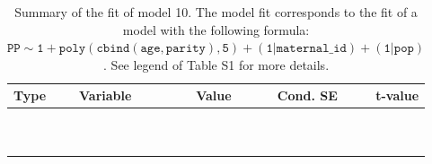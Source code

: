 \begin{table}

\caption{\label{tab:tab10}Summary of the fit of model 10. The model fit corresponds to the fit of a model with the following formula: {\small$\mathtt{PP \sim 1 + poly(cbind(age, parity), 5) + (1 | maternal\_id) + (1 | pop)}$}. See legend of Table S1 for more details.}
\centering
\fontsize{8}{10}\selectfont
\begin{tabular}[t]{>{\raggedright\arraybackslash}p{3cm}>{\raggedright\arraybackslash}p{5cm}rrr}
\toprule
Type & Variable & Value & Cond. SE & t-value\\
\midrule
\cellcolor{gray!6}{fixed effects} & \cellcolor{gray!6}{$\beta_1$} & \cellcolor{gray!6}{1.56} & \cellcolor{gray!6}{0.179} & \cellcolor{gray!6}{8.67}\\
\cellcolor{gray!6}{} & \cellcolor{gray!6}{$\beta_{\mathtt{age}}$} & \cellcolor{gray!6}{-421} & \cellcolor{gray!6}{59.7} & \cellcolor{gray!6}{-7.04}\\
\cellcolor{gray!6}{} & \cellcolor{gray!6}{$\beta_{\mathtt{age}^2}$} & \cellcolor{gray!6}{-185} & \cellcolor{gray!6}{51.8} & \cellcolor{gray!6}{-3.57}\\
\cellcolor{gray!6}{} & \cellcolor{gray!6}{$\beta_{\mathtt{age}^3}$} & \cellcolor{gray!6}{-43.4} & \cellcolor{gray!6}{32.6} & \cellcolor{gray!6}{-1.33}\\
\cellcolor{gray!6}{} & \cellcolor{gray!6}{$\beta_{\mathtt{age}^4}$} & \cellcolor{gray!6}{-15.8} & \cellcolor{gray!6}{14.4} & \cellcolor{gray!6}{-1.1}\\
\cellcolor{gray!6}{} & \cellcolor{gray!6}{$\beta_{\mathtt{age}^5}$} & \cellcolor{gray!6}{2.3} & \cellcolor{gray!6}{9.7} & \cellcolor{gray!6}{0.237}\\
\cellcolor{gray!6}{} & \cellcolor{gray!6}{$\beta_{\mathtt{parity}}$} & \cellcolor{gray!6}{48} & \cellcolor{gray!6}{97.7} & \cellcolor{gray!6}{0.491}\\
\cellcolor{gray!6}{} & \cellcolor{gray!6}{$\beta_{\mathtt{age}\times\mathtt{parity}}$} & \cellcolor{gray!6}{13240} & \cellcolor{gray!6}{39545} & \cellcolor{gray!6}{0.335}\\
\cellcolor{gray!6}{} & \cellcolor{gray!6}{$\beta_{\mathtt{age}^2\times\mathtt{parity}}$} & \cellcolor{gray!6}{-34019} & \cellcolor{gray!6}{30565} & \cellcolor{gray!6}{-1.11}\\
\cellcolor{gray!6}{} & \cellcolor{gray!6}{$\beta_{\mathtt{age}^3\times\mathtt{parity}}$} & \cellcolor{gray!6}{-330} & \cellcolor{gray!6}{14760} & \cellcolor{gray!6}{-0.0224}\\

\end{tabular}
\end{table}
